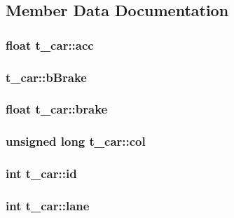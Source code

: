 \subsection{\-Member \-Data \-Documentation}
\hypertarget{structt__car_a3d974cfb09aa4555ce19b623589ac0cb}{
\subsubsection[{acc}]{\setlength{\rightskip}{0pt plus 5cm}float {\bf t\-\_\-car\-::acc}}}\label{structt__car_a3d974cfb09aa4555ce19b623589ac0cb}
\hypertarget{structt__car_a8c67c03c2cd5bd36ba04feadd45cbd50}{
\subsubsection[{b\-Brake}]{ {\bf t\-\_\-car\-::b\-Brake}}}\label{structt__car_a8c67c03c2cd5bd36ba04feadd45cbd50}
\hypertarget{structt__car_a99a3e9cc3f2c4f0d57e52ef87b9343fa}{
\subsubsection[{brake}]{\setlength{\rightskip}{0pt plus 5cm}float {\bf t\-\_\-car\-::brake}}}\label{structt__car_a99a3e9cc3f2c4f0d57e52ef87b9343fa}
\hypertarget{structt__car_ac5ad0d3582b9a696c171c3a943bf9c12}{
\subsubsection[{col}]{\setlength{\rightskip}{0pt plus 5cm}unsigned long {\bf t\-\_\-car\-::col}}}\label{structt__car_ac5ad0d3582b9a696c171c3a943bf9c12}
\hypertarget{structt__car_ae4e15e66283de93090043ebdb1459cf9}{
\subsubsection[{id}]{\setlength{\rightskip}{0pt plus 5cm}int {\bf t\-\_\-car\-::id}}}\label{structt__car_ae4e15e66283de93090043ebdb1459cf9}
\hypertarget{structt__car_a4fc68a1290291bbca8b81e4809c81f1f}{
\subsubsection[{lane}]{\setlength{\rightskip}{0pt plus 5cm}int {\bf t\-\_\-car\-::lane}}}\label{structt__car_a4fc68a1290291bbca8b81e4809c81f1f}
